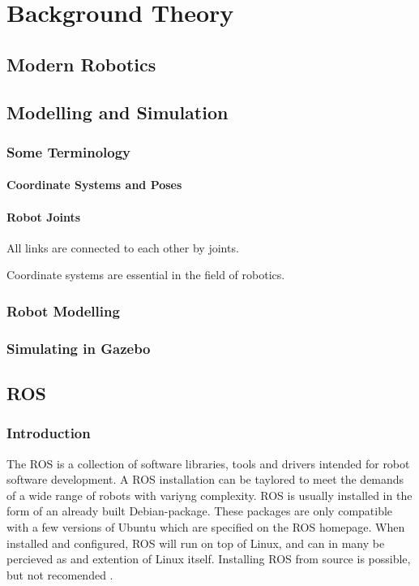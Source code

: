 \chapter{Background Theory}
\label{chp:theory} 


\section{Modern Robotics}

\section{Modelling and Simulation}

\subsection{Some Terminology}

\subsubsection{Coordinate Systems and Poses}

\subsubsection{Robot Joints}

All links are connected to each other by joints. 

Coordinate systems are essential in the field of robotics. 

\subsection{Robot Modelling}

\subsection{Simulating in Gazebo}

\section{ROS}

\subsection{Introduction}

The \ac{ROS} is a collection of software libraries, tools and drivers intended for robot software development. A \ac{ROS} installation can be taylored to meet the demands of a wide range of robots with variyng complexity. \ac{ROS} is usually installed in the form of an already built Debian-package. These packages are only compatible with a few versions of Ubuntu which are specified on the \ac{ROS} homepage. When installed and configured, \ac{ROS} will run on top of Linux, and can in many be percieved as and extention of Linux itself. Installing \ac{ROS} from source is possible, but not recomended \cite{ROS_install}.

